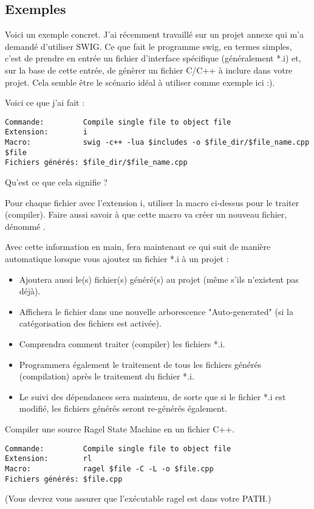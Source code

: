 \subsection{Exemples}


Voici un exemple concret. J'ai récemment travaillé sur un projet annexe qui m'a demandé d'utiliser SWIG. Ce que fait le programme swig, en termes simples, c'est de prendre en entrée un fichier d'interface spécifique (généralement *.i) et, sur la base de cette entrée, de génèrer un fichier C/C++ à inclure dans votre projet. Cela semble être le scénario idéal à utiliser comme exemple ici :).

Voici ce que j'ai fait : 
\begin{verbatim}
Commande:         Compile single file to object file
Extension:        i
Macro:            swig -c++ -lua $includes -o $file_dir/$file_name.cpp $file
Fichiers générés: $file_dir/$file_name.cpp
\end{verbatim}

Qu'est ce que cela signifie ?

Pour chaque fichier avec l'extension i, utiliser la macro ci-dessus pour le traiter (compiler). Faire aussi savoir à \codeblocks que cette macro va créer un nouveau fichier, dénommé .

Avec cette information en main, \codeblocks fera maintenant ce qui suit de manière automatique lorsque vous ajoutez un fichier *.i à un projet :
\begin{itemize}
\item Ajoutera aussi le(s) fichier(s) généré(s) au projet (même s'ils n'existent pas déjà).
\item Affichera le fichier dans une nouvelle arborescence "Auto-generated" (si la catégorisation des fichiers est activée).
\item Comprendra comment traiter (compiler) les fichiers *.i.
\item Programmera également le traitement de tous les fichiers générés (compilation) après le traitement du fichier *.i.
\item Le suivi des dépendances sera maintenu, de sorte que si le fichier *.i est modifié, les fichiers générés seront re-générés également.
\end{itemize}


Compiler une source Ragel State Machine en un fichier C++.
\begin{verbatim}
Commande:         Compile single file to object file
Extension:        rl
Macro:            ragel $file -C -L -o $file.cpp
Fichiers générés: $file.cpp
\end{verbatim}
(Vous devrez vous assurer que l'exécutable ragel est dans votre PATH.)\newline

